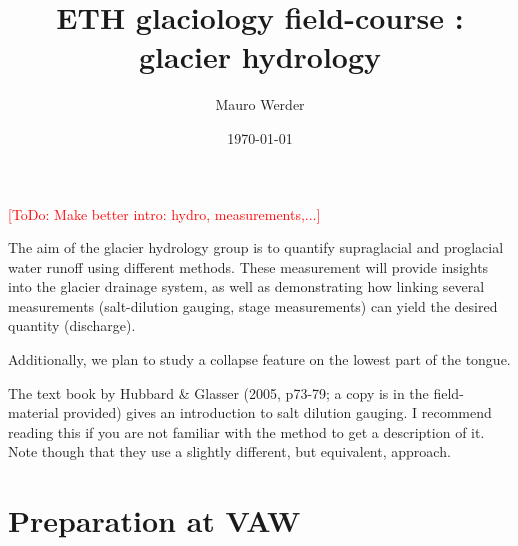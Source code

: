 \documentclass[DIV=15,halfparskip,11pt,headinclude]{scrartcl}
\author{Mauro Werder}
\date{\today}
\title{ETH glaciology field-course \the\year{}:\\ glacier hydrology}
\newcommand{\todo}[1]{\textcolor{red}{[ToDo: #1]}}
\newcommand{\todo}[1]{}
\begin{document}
  \maketitle
  \todo{Make better intro: hydro, measurements,...}

The aim of the glacier hydrology group is to quantify supraglacial and
proglacial water runoff using different methods.  %
These measurement
will provide insights into the glacier drainage system, as well as
demonstrating how linking several measurements (salt-dilution gauging,
stage measurements) can yield the desired quantity (discharge).

Additionally, we plan to study a collapse feature on the lowest part
of the tongue.

The text book by Hubbard \& Glasser (2005, p73-79; a copy is in the
field-material provided) gives an introduction to salt dilution
gauging.  I recommend reading this if you are not familiar with the
method to get a description of it.  Note though that they use a
slightly different, but equivalent, approach.

\section{Preparation at VAW}

%
\end{document}
